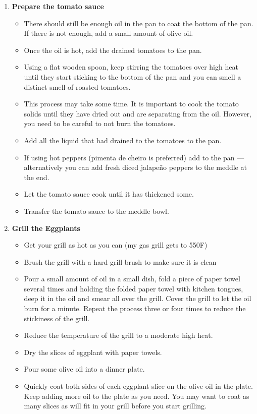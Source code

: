 \documentclass [11pt, letterpaper] {article}
\begin{document}
\begin{description}
\begin{enumerate}
\begin{itemize}
		\end{itemize}
	\item {\bf Prepare the tomato sauce}
		\begin{itemize}
		\item There should still be enough oil in the pan to coat the bottom of the pan. If there is not enough, add a small amount of olive oil.
		\item Once the oil is hot, add the drained tomatoes to the pan. 
		\item Using a flat wooden spoon, keep stirring the tomatoes over high heat until they start sticking to the bottom of the pan and you can smell a distinct smell of roasted tomatoes.
		\item This process may take some time. It is important to cook the tomato solids until they have dried out and are separating from the oil. However, you need to be careful to not burn the tomatoes.
		\item Add all the liquid that had drained to the tomatoes to the pan.
		\item If using hot peppers (pimenta de cheiro is preferred) add to the pan  --- alternatively you can add fresh diced jalape\~no peppers to the meddle at the end.
		\item Let the tomato sauce cook until it has thickened some.
		\item Transfer the tomato sauce to the meddle bowl.	
		\end{itemize}
	\item {\bf Grill the Eggplants}
	\begin{itemize}	
		\item Get your grill as hot as you can (my gas grill gets to 550F)
	 	\item Brush the grill with a hard grill brush to make sure it is clean
	 	\item Pour a small amount of oil in a small dish, fold a piece of paper towel several times and holding the folded paper towel with kitchen tongues, deep it in the oil and smear all over the grill. Cover the grill to let the oil burn for a minute. Repeat the process three or four times to reduce the stickiness of the grill. 
		\item Reduce the temperature of the grill to a moderate high heat.
		\item Dry the slices of eggplant  with paper towels.
		\item Pour some olive oil into a dinner plate.
		\item Quickly coat both sides of each eggplant slice on the olive oil in the plate. Keep adding more oil to the plate as you need. You may want to coat as many slices as will fit in your grill before you start grilling.

\end{itemize}
\end{enumerate}
\end{description}
\end{document}
